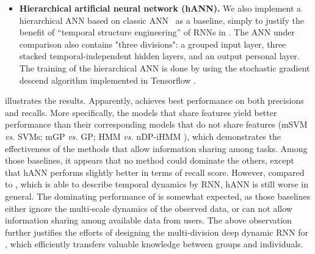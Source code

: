 {\begin{itemize}
  \item
  \textbf{Hierarchical artificial neural network (hANN).}
  We also implement a hierarchical ANN based on classic ANN~\cite{bib:wang2003artificial} as a baseline, simply to justify the benefit of ``temporal structure engineering'' of RNNs in \modelname. The ANN under comparison also contains "three divisions": a grouped input layer, three stacked temporal-independent hidden layers, and an output personal layer. The training of the hierarchical ANN is done by using the stochastic gradient descend algorithm implemented in Tensorflow \cite{bib:Tensorflow}.


\end{itemize}

 illustrates the results.
Apparently, \modelname achieves best performance on both precisions and recalls.
More specifically,  the models that share features yield better performance than their corresponding models that do not share features (\ie mSVM \emph{vs.} SVMs; mGP \emph{vs.} GP; HMM \emph{vs.} nDP-iHMM ), which demonstrates the effectiveness of the methods that allow information sharing among tasks.
Among those baselines, it appears that no method could dominate the others, except that hANN performs slightly better in terms of recall score.
However, compared to \modelname, which is able to describe temporal dynamics by RNN, hANN is still worse in general.
The dominating performance of \modelname is somewhat expected, as those baselines either ignore the multi-scale dynamics of the observed data, or can not allow information sharing among available data from users.
The above observation further justifies the efforts of designing the multi-division deep dynamic RNN for \sysname, which efficiently transfers valuable knowledge between groups and individuals.
}

